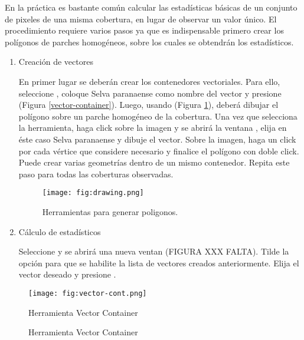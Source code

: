 En la práctica es bastante común calcular las estadísticas básicas de un conjunto de pixeles de una misma cobertura, en lugar de observar un valor único. El procedimiento requiere varios pasos ya que es indispensable primero crear los polígonos de parches homogéneos, sobre los cuales se obtendrán los estadísticos.
\begin{enumerate}
	\item Creación de vectores

	En primer lugar se deberán crear los contenedores vectoriales. Para ello, seleccione , coloque Selva paranaense como nombre del vector y presione  (Figura \ref{vector-container}). Luego, usando   (Figura \ref{fig:drawing}), deberá dibujar el polígono sobre un parche homogéneo de la cobertura. Una vez que selecciona la herramienta, haga click sobre la imagen y se abrirá la ventana , elija en éste caso Selva paranaense y dibuje el vector. Sobre la imagen, haga un click por cada vértice que considere necesario y finalice el polígono con doble click. Puede crear varias geometrías dentro de un mismo contenedor. Repita este paso para todas las coberturas observadas.

  \begin{figure}[H]
      \centering
      \texttt{[image: fig:drawing.png]}
      \caption{Herramientas para generar poligonos.}
      \label{fig:drawing}
  \end{figure}

	\item Cálculo de estadísticos

	Seleccione  y se abrirá una nueva ventan (FIGURA  XXX FALTA). Tilde la opción  para que se habilite la lista de vectores creados anteriormente. Elija el vector deseado y presione .
\end{enumerate}



\begin{figure}[h!]
    \centering
    \texttt{[image: fig:vector-cont.png]}
    \caption{Herramienta Vector Container}
    \label{fig:vector-container}
\end{figure}



\begin{figure}[h!]
    \centering
    \caption{Herramienta Vector Container}
    \label{fig:vector-container}
\end{figure}



